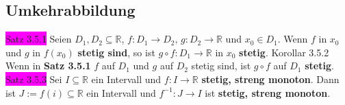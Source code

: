\documentclass[landscape, 10pt]{article}
\newcommand{\R}{\mathbb{R}}
\begin{document}
\begin{multicols}{3}
       \subsection{Umkehrabbildung}
              \colorbox{magenta}{Satz 3.5.1} Seien \textcolor{NavyBlue}{$D_1,D_2\subseteq\R$, 
                     $f:D_1\longrightarrow D_2,\,g:D_2\longrightarrow\R$} und 
                     \textcolor{NavyBlue}{$x_0\in D_1$}.
                     Wenn \textcolor{NavyBlue}{$f$} in \textcolor{NavyBlue}{$x_0$} und 
                     \textcolor{NavyBlue}{$g$} in \textcolor{NavyBlue}{$f(x_0)$} 
                     \textbf{stetig sind}, 
                     so ist \textcolor{NavyBlue}{
                     $g\circ f:D_1\longrightarrow\R$} in \textcolor{NavyBlue}{$x_0$} 
                     \textbf{stetig}.
              \colorbox{BurntOrange}{Korollar 3.5.2} Wenn in \textbf{Satz 3.5.1} 
                     \textcolor{NavyBlue}{$f$} auf \textcolor{NavyBlue}{$D_1$} und 
                     \textcolor{NavyBlue}{$g$} auf \textcolor{NavyBlue}{$D_2$}
                     stetig sind, ist \textcolor{NavyBlue}{$g\circ f$} auf 
                     \textcolor{NavyBlue}{$D_1$}
                     \textbf{stetig}.
              \colorbox{magenta}{Satz 3.5.3} Sei \textcolor{NavyBlue}{$I\subseteq\R$} 
                     ein Intervall und 
                     \textcolor{NavyBlue}{$f:I\longrightarrow\R$} 
                     \textbf{stetig, streng monoton}. Dann ist 
                     \textcolor{NavyBlue}{$J:=f(i)\subseteq\R$} ein Intervall 
                     und \textcolor{NavyBlue}{$f^{-1}:J\longrightarrow I$} 
                     ist \textbf{stetig, streng monoton}.

\end{multicols}
\end{document}
